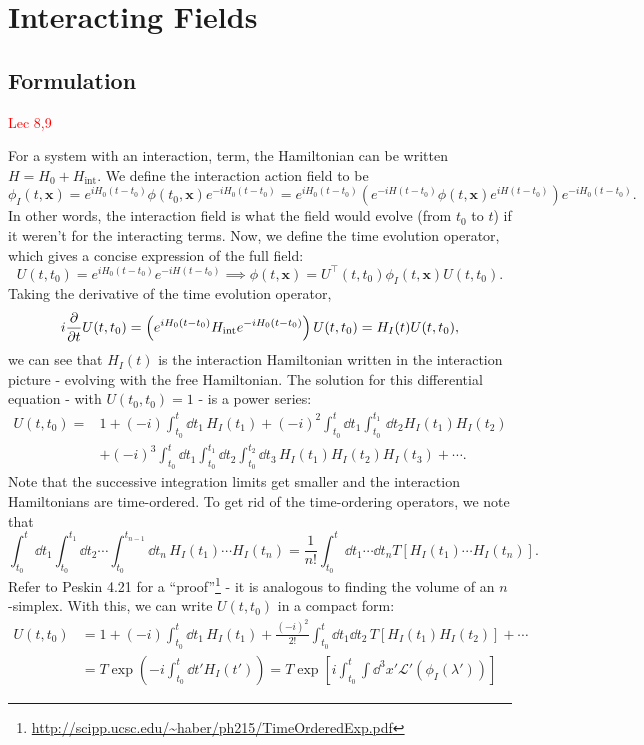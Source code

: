 \documentclass{article}
\begin{document}
\pagebreak

\section{Interacting Fields}
\subsection{Formulation}
\textcolor{red}{Lec 8,9}

For a system with an interaction, term, the Hamiltonian can be written $H=H_0+H_\text{int}$. We define the interaction action field to be 
$$\phi_I(t,\mathbf x)=e^{iH_0(t-t_0)}\phi(t_0,\mathbf x)e^{-iH_0(t-t_0)}=e^{iH_0(t-t_0)}\left(e^{-iH(t-t_0)}\phi(t,\mathbf x)e^{iH(t-t_0)}\right)e^{-iH_0(t-t_0)}.$$
In other words, the interaction field is what the field would evolve (from $t_0$ to $t$) if it weren't for the interacting terms. Now, we define the time evolution operator, which gives a concise expression of the full field:
$$U(t,t_0)=e^{iH_0(t-t_0)}e^{-iH(t-t_0)}\implies \phi(t,\mathbf x)=U^\intercal(t,t_0)\phi_I(t,\mathbf x)U(t,t_0).$$
Taking the derivative of the time evolution operator, 
$$i \frac{\partial }{\partial t}U(t,t_0)=\left(e^{iH_0(t-t_0)}H_\text{int} e^{-iH_0(t-t_0)}\right)U(t,t_0)=H_I(t)U(t,t_0),$$
we can see that $H_I(t)$ is the interaction Hamiltonian written in the interaction picture - evolving with the free Hamiltonian. The solution for this differential equation - with $U(t_0,t_0)=1$ - is a power series:
\begin{align*}
    U(t,t_0)=&1+(-i)\int^t_{t_0}\dd t_1\,H_I(t_1)+(-i)^2\int^t_{t_0}\dd t_1\int^{t_1}_{t_0}\,\dd t_2H_I(t_1)H_I(t_2)\\
    &+(-i)^3\int^t_{t_0}\dd t_1\int^{t_1}_{t_0}\dd t_2\int^{t_2}_{t_0}\dd t_3\,H_I(t_1)H_I(t_2)H_I(t_3)+\cdots.
\end{align*}
Note that the successive integration limits get smaller and the interaction Hamiltonians are time-ordered. To get rid of the time-ordering operators, we note that 
$$\int^t_{t_0}\dd t_1\int^{t_1}_{t_0}\dd t_2\cdots\int^{t_{n-1}}_{t_0}\dd t_n\,H_I(t_1)\cdots H_I(t_n)=\frac 1{n!}\int^t_{t_0}\dd t_1\cdots\dd t_n T\left[H_I(t_1)\cdots H_I(t_n)\right].$$
Refer to Peskin 4.21 for a ``proof''\footnote{\url{http://scipp.ucsc.edu/~haber/ph215/TimeOrderedExp.pdf}} - it is analogous to finding the volume of an $n$-simplex. With this, we can write $U(t,t_0)$ in a compact form:
\begin{align*}
    U(t,t_0)&=1+(-i)\int^t_{t_0}\dd t_1\,H_I(t_1)+\frac{(-i)^2}{2!}\int^t_{t_0}\dd t_1\dd t_2\,T[H_I(t_1)H_I(t_2)]+\cdots\\
    &=T\exp\left(-i\int^t_{t_0}\dd t'H_I(t')\right)=T\exp\left[i\int^t_{t_0}\int\dd^3x'\mathcal L'(\phi_I(\lambda'))\right]
\end{align*}
\end{document}
